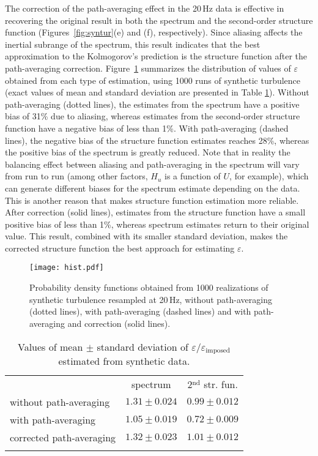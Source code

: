 \documentclass{svjour3}                     %
\begin{document}
The correction of the path-averaging effect in the 20\,Hz data is
effective in recovering the original result in both the spectrum and
the second-order structure function (Figures~\ref{fig:syntur}(e) and
(f), respectively). Since aliasing affects the inertial subrange of
the spectrum, this result indicates that the best approximation to the
Kolmogorov's prediction is the structure function after the
path-averaging correction. Figure~\ref{fig:synhist} summarizes the
distribution of values of $\varepsilon$ obtained from each type of
estimation, using 1000 runs of synthetic turbulence (exact values of
mean and standard deviation are presented in Table
\ref{tab:syntur}). Without path-averaging (dotted lines), the
estimates from the spectrum have a positive bias of 31\% due to
aliasing, whereas estimates from the second-order structure function
have a negative bias of less than 1\%. With path-averaging (dashed
lines), the negative bias of the structure function estimates reaches
28\%, whereas the positive bias of the spectrum is greatly
reduced. Note that in reality the balancing effect between aliasing
and path-averaging in the spectrum will vary from run to run (among
other factors, $H_u$ is a function of $U$, for example), which can
generate different biases for the spectrum estimate depending on the
data. This is another reason that makes structure function estimation
more reliable. After correction (solid lines), estimates from
the structure function have a small positive bias of less than
1\%, whereas spectrum estimates return to their original value. This
result, combined with its smaller standard deviation, makes the
corrected structure function the best approach for estimating $\varepsilon$.

\begin{figure}\centering
  \texttt{[image: hist.pdf]}
  \caption{Probability density functions obtained from 1000
    realizations of synthetic turbulence resampled at 20\,Hz, without
    path-averaging (dotted lines), with path-averaging (dashed lines)
    and with path-averaging and correction (solid
    lines). \label{fig:synhist}}
\end{figure}

\begin{table}
  \begin{center}
    \caption{Values of mean $\pm$ standard deviation of $\varepsilon/\varepsilon_{\text{imposed}}$ estimated from synthetic data.}
    \begin{tabular}{lcc}
      \hline\noalign{\smallskip}
      & spectrum & 2$^{\text{nd}}$ str. fun. \\ 
      \noalign{\smallskip}\hline\noalign{\smallskip}
      without path-averaging & $1.31\pm 0.024$  & $0.99\pm 0.012$ \\
      with path-averaging & $1.05\pm 0.019$  & $0.72\pm 0.009$ \\
      corrected path-averaging & $1.32\pm 0.023$  & $1.01 \pm 0.012$ \\
      \noalign{\smallskip}\hline
    \end{tabular}
    \label{tab:syntur}
  \end{center}
\end{table}
\end{document}
